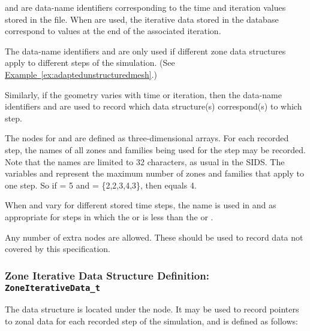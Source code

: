  and  are data-name identifiers
corresponding to the time and iteration values stored in the file.
When  are used, the iterative data stored in the
database correspond to values at the end of the associated iteration.

The data-name identifiers  and 
are only used if different zone data structures apply to different steps
of the simulation.
(See \hyperref[ex:adaptedunstructuredmesh]{Example~\ref*{ex:adaptedunstructuredmesh}}.)

Similarly, if the geometry varies with time or iteration, then the
data-name identifiers  and 
are used to record which  data structure(s)
correspond(s) to which step.

The  nodes for  and
 are defined as three-dimensional arrays.
For each recorded step, the names of all zones and families being
used for the step may be recorded.
Note that the names are limited to 32 characters, as usual in the SIDS.
The variables  and 
represent the maximum number of zones and families that apply to
one step.
So if  = 5 and  = \{2,2,3,4,3\},
then  equals 4.

When  and  vary for
different stored time steps, the name  is used in
 and  as appropriate for
steps in which the  or 
is less than the  or .

Any number of extra  nodes are allowed.
These should be used to record data not covered by this specification.

\subsubsection{Zone Iterative Data Structure Definition: \texttt{ZoneIterativeData\_t}}
\label{s:ZoneIterativeData}

The  data structure is located under the
 node.
It may be used to record pointers to zonal data for each recorded step of
the simulation, and is defined as follows:


